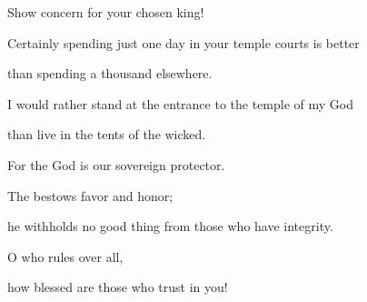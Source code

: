 {\par }{\Q Show
concern
for your chosen king!
\par }{\Q {}Certainly
spending
just one day
in your temple courts
is better
\par }{\Q than spending
a thousand
elsewhere.
\par }{\Q I would rather stand at the entrance to the temple
of my God
\par }{\Q than live in the tents
of the wicked.
\par }{\Q {}For
the {}
God
is our sovereign protector.
\par }{\Q The
{}
bestows
favor
and honor;
\par }{\Q he withholds
no
good
thing from those who have integrity.
\par }{\Q {}O
{}
who rules over all,

\par }{\Q how blessed
are those
who trust in you!


}
